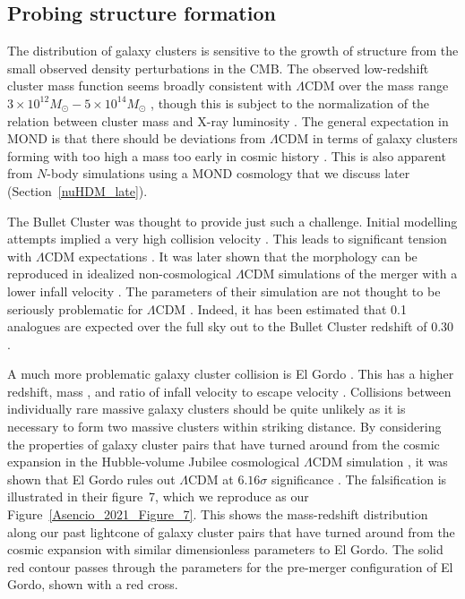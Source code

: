 \documentclass[fleqn,usenatbib,useAMS]{mnras} %
\begin{document}
\subsection{Probing structure formation}
\label{Galaxy_clusters_formation}

The distribution of galaxy clusters is sensitive to the growth of structure from the small observed density perturbations in the CMB. The observed low-redshift cluster mass function seems broadly consistent with $\Lambda$CDM over the mass range $3 \times 10^{12} M_\odot - 5 \times 10^{14} M_\odot$ \citep{Bohringer_2017}, though this is subject to the normalization of the relation between cluster mass and X-ray luminosity \citep{Bohringer_2014, Schrabback_2021_calibration}. The general expectation in MOND is that there should be deviations from $\Lambda$CDM in terms of galaxy clusters forming with too high a mass too early in cosmic history \citep{Sanders_2001}. This is also apparent from $N$-body simulations \citep{Angus_2013, Katz_2013} using a MOND cosmology that we discuss later (Section~\ref{nuHDM_late}).

The Bullet Cluster was thought to provide just such a challenge. Initial modelling attempts implied a very high collision velocity \citep{Milosavljevic_2007, Springel_2007, Mastropietro_2008}. This leads to significant tension with $\Lambda$CDM expectations \citep{Lee_2010, Thompson_Nagamine_2012}. It was later shown that the morphology can be reproduced in idealized non-cosmological $\Lambda$CDM simulations of the merger with a lower infall velocity \citep{Lage_Farrar_2014}. The parameters of their simulation are not thought to be seriously problematic for $\Lambda$CDM \citep{Watson_2014, Thompson_2015}. Indeed, it has been estimated that 0.1 analogues are expected over the full sky out to the Bullet Cluster redshift of 0.30 \citep{Kraljic_2015}.

A much more problematic galaxy cluster collision is El Gordo \citep{Menanteau_2010, Menanteau_2012}. This has a higher redshift, mass \citep{Jee_2014}, and ratio of infall velocity to escape velocity \citep{Molnar_2015, Ng_2015, Zhang_2015}. Collisions between individually rare massive galaxy clusters should be quite unlikely as it is necessary to form two massive clusters within striking distance. By considering the properties of galaxy cluster pairs that have turned around from the cosmic expansion in the Hubble-volume Jubilee cosmological $\Lambda$CDM simulation \citep{Watson_2013}, it was shown that El Gordo rules out $\Lambda$CDM at $6.16\sigma$ significance \citep*{Asencio_2021}. The falsification is illustrated in their figure~7, which we reproduce as our Figure~\ref{Asencio_2021_Figure_7}. This shows the mass-redshift distribution along our past lightcone of galaxy cluster pairs that have turned around from the cosmic expansion with similar dimensionless parameters to El Gordo. The solid red contour passes through the parameters for the pre-merger configuration of El Gordo, shown with a red cross.
\end{document}

